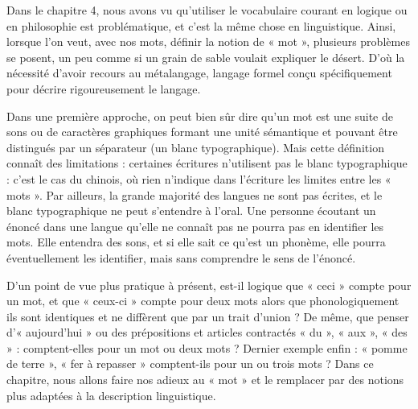 \begin{keybox}[Introduction]
\renewcommand{\thempfootnote}{校\arabic{editorialnote}}
Dans le chapitre 4, nous avons vu qu’utiliser le vocabulaire courant en logique ou en philosophie est problématique, et c’est la même chose en linguistique. Ainsi, lorsque l’on veut, avec nos mots, définir la notion de « mot », plusieurs problèmes se posent, un peu comme si un grain de sable voulait expliquer le désert. D’où la nécessité d’avoir recours au métalangage, langage formel conçu spécifiquement pour décrire rigoureusement le langage.

Dans une première approche, on peut bien sûr dire qu’un mot est une suite de sons ou de caractères graphiques formant une unité sémantique et pouvant être distingués par un séparateur (un blanc typographique). Mais cette définition connaît des limitations : certaines écritures n’utilisent pas le blanc typographique : c’est le cas du chinois, où rien n’indique dans l’écriture les limites entre les « mots ». Par ailleurs, la grande majorité des langues ne sont pas écrites, et le blanc typographique ne peut s’entendre à l’oral. Une personne écoutant un énoncé dans une langue qu’elle ne connaît pas ne pourra pas en identifier les mots. Elle entendra des sons, et si elle sait ce qu’est un phonème, elle pourra éventuellement les identifier, mais sans comprendre le sens de l’énoncé.

D’un point de vue plus pratique à présent, est-il logique que « ceci » compte pour un mot, et que « ceux-ci » compte pour deux mots alors que phonologiquement ils sont identiques et ne diffèrent que par un trait d’union ? De même, que penser d’« aujourd’hui » ou des prépositions et articles contractés « du », « aux », « des » : comptent-elles pour un mot ou deux mots ? Dernier exemple enfin : « pomme de terre », « fer à repasser » comptent-ils pour un ou trois mots ? Dans ce chapitre, nous allons faire nos adieux au « mot » et le remplacer par des notions plus adaptées à la description linguistique.
\end{keybox}

